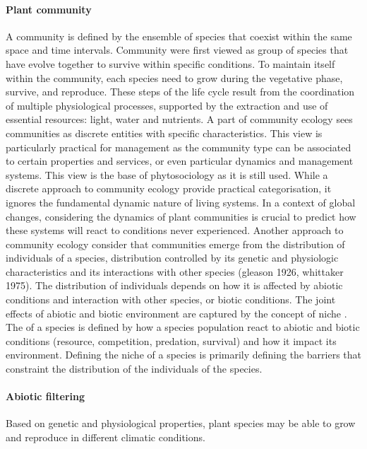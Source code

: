\paragraph{Plant community}

A community is defined by the ensemble of species that coexist within the same space and time intervals. Community were first viewed as group of species that have evolve together to survive within specific conditions. To maintain itself within the community, each species need to grow during the vegetative phase, survive, and reproduce. These steps of the life cycle result from the coordination of multiple physiological processes, supported by the extraction and use of essential resources: light, water and nutrients. A part of community ecology sees communities as discrete entities with specific characteristics. This view is particularly practical for management as the community type can be associated to certain properties and services, or even particular dynamics and management systems. This view is the base of phytosociology as it is still used. While a discrete approach to community ecology provide practical categorisation, it ignores the fundamental dynamic nature of living systems. In a context of global changes, considering the dynamics of plant communities is crucial to predict how these systems will react to conditions never experienced. Another approach to community ecology consider that communities emerge from the distribution of individuals of a species, distribution controlled by its genetic and physiologic characteristics and its interactions with other species (gleason 1926, whittaker 1975). The distribution of individuals depends on how it is affected by abiotic conditions and interaction with other species, or biotic conditions. The joint effects of abiotic and biotic environment are captured by the concept of niche \parencite{elton_1927}. The  of a species is defined by how a species population react to abiotic and biotic conditions (resource, competition, predation, survival) and how it impact its environment. Defining the niche of a species is primarily defining the barriers that constraint the distribution of the individuals of the species.

\paragraph{Abiotic filtering}

Based on genetic and physiological properties, plant species may be able to grow and reproduce in different climatic conditions.

